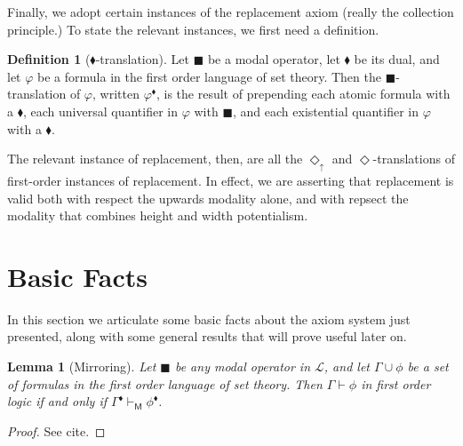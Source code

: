 \documentclass{article}
\newtheorem{Lemma}[Theorem]{Lemma}
\theoremstyle{definition}
\newtheorem{Definition}[Theorem]{Definition}
\newcommand{\du}{\Diamond_\uparrow}
\begin{document}
Finally, we adopt certain instances of the replacement axiom (really the 
collection principle.) To state the relevant instances, we first need a definition.

\begin{Definition}[$\blacklozenge$-translation]
    Let $\blacksquare$ be a modal operator, let $\blacklozenge$ be its dual, and let 
    $\varphi$ be a formula in the first order language of set theory. 
    Then the $\blacksquare$-translation of $\varphi$, written $\varphi^\blacklozenge$, 
    is the result of prepending each atomic formula with a $\blacklozenge$, 
    each universal quantifier in $\varphi$ with $\blacksquare$,
    and each existential quantifier in $\varphi$ with a $\blacklozenge$.
\end{Definition}

The relevant instance of replacement, then, are all the $\du$ and $\Diamond$-translations 
of first-order instances of replacement. In effect, we are asserting that replacement 
is valid both with respect the upwards modality alone, and with repsect the modality 
that combines height and width potentialism.

\section{Basic Facts}
In this section we articulate some basic facts about the axiom system just presented, 
along with some general results that will prove useful later on. 

\begin{Lemma}[Mirroring]
    Let $\blacksquare$ be any modal operator in $\mathcal{L}$, and let $\Gamma 
    \cup {\phi}$ be a set of formulas in the first order language of set theory. Then
    $\Gamma \vdash \phi$ in first order logic if and only if 
    $\Gamma^\blacklozenge \vdash_\mathsf{M} \phi^\blacklozenge$.
\end{Lemma}
\begin{proof}
    See cite.
\end{proof}
\end{document}
